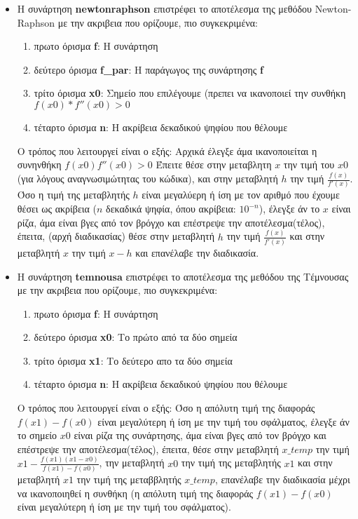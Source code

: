 \documentclass[a4paper,11pt]{article}
\newcommand{\lt}{\latintext}
\newcommand{\gt}{\greektext}
\begin{document}
\begin{flushleft}
\begin{itemize}
	
\item Η συνάρτηση \lt \textbf{newtonraphson} \gt επιστρέφει το αποτέλεσμα της μεθόδου \lt Newton-Raphson \gt με την ακριβεια που ορίζουμε, πιο συγκεκριμένα:\linebreak 
	\begin{enumerate}
\item πρωτο όρισμα \lt \textbf{f}: \gt Η συνάρτηση
\item δεύτερο όρισμα \lt \textbf{f\_par}: \gt Η παράγωγος της συνάρτησης \lt \textbf{f} 
\item \gt τρίτο όρισμα \lt \textbf{x0}: \gt Σημείο που επιλέγουμε (πρεπει να ικανοποιεί την συνθήκη \lt $f(x0)*f''(x0)>0$
\item \gt τέταρτο όρισμα \lt \textbf{n}: \gt Η ακρίβεια δεκαδικού ψηφίου που θέλουμε
\end{enumerate}
Ο τρόπος που λειτουργεί είναι ο εξής:\linebreak 
	Αρχικά έλεγξε άμα ικανοποιείται η συνηνθήκη $f(x0)f''(x0)>0$\linebreak
	Έπειτε θέσε στην μεταβλητη $x$ την τιμή του $x0$ (για λόγους αναγνωσιμώτητας του κώδικα), και στην μεταβλητή $h$ την τιμή $\frac{f(x)}{f'(x)}$.
	Όσο η τιμή της μεταβλητής $h$ είναι μεγαλύερη ή ίση με τον αριθμό που έχουμε θέσει ως ακρίβεια ($n$ δεκαδικά ψηφία, όπου ακρίβεια: $10^{-n}$), έλεγξε άν το $x$ είναι ρίζα, άμα είναι βγες από τον βρόγχο και επέστρεψε την αποτέλεσμα(τέλος),\linebreak
	έπειτα, (αρχή διαδικασίας) θέσε στην μεταβλητή $h$ την τιμή $\frac{f(x)}{f'(x)}$ και στην μεταβλητή $x$ την τιμή $x-h$ και επανέλαβε την διαδικασία.  
	\linebreak
	
	\item Η συνάρτηση \lt \textbf{temnousa} \gt επιστρέφει το αποτέλεσμα της μεθόδου της Τέμνουσας με την ακριβεια που ορίζουμε, πιο συγκεκριμένα:\linebreak 
	\begin{enumerate}
\item πρωτο όρισμα \lt \textbf{f}: \gt Η συνάρτηση
\item δεύτερο όρισμα \lt \textbf{x0}: \gt Το πρώτο από τα δύο σημεία 
\item \gt τρίτο όρισμα \lt \textbf{x1}: \gt Το δεύτερο απο τα δύο σημεία
\item \gt τέταρτο όρισμα \lt \textbf{n}: \gt Η ακρίβεια δεκαδικού ψηφίου που θέλουμε
\end{enumerate}\pagebreak 
Ο τρόπος που λειτουργεί είναι ο εξής:\linebreak 
	Όσο η απόλυτη τιμή της διαφοράς $f(x1)-f(x0)$ είναι μεγαλύτερη ή ίση με την τιμή του σφάλματος, έλεγξε άν το σημείο $x0$ είναι ρίζα της συνάρτησης, άμα είναι βγες από τον βρόγχο και επέστρεψε την αποτέλεσμα(τέλος),\linebreak
	έπειτα, θέσε στην μεταβλητή $x\_temp$ την τιμή $x1 - \frac{f(x1)(x1-x0)}{f(x1)-f(x0)}$, την μεταβλητή $x0$ την τιμή της μεταβλητής $x1$ και στην μεταβλητή $x1$ την τιμή της μεταββλητής $x\_temp$, επανέλαβε την διαδικασία μέχρι να ικανοποιηθεί η συνθήκη (η απόλυτη τιμή της διαφοράς $f(x1)-f(x0)$ είναι μεγαλύτερη ή ίση με την τιμή του σφάλματος).

\end{itemize}
\end{flushleft}
\end{document}
